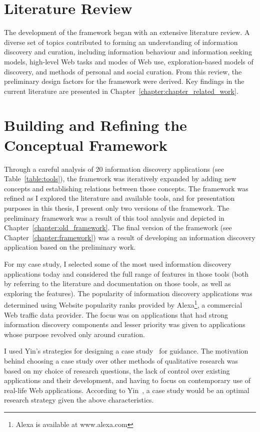 {\section{Literature Review}
\label{section:lit_review}
The development of the framework began with an extensive literature review. A diverse set of topics contributed to forming an understanding of information discovery and curation, including information behaviour and information seeking models, high-level Web tasks and modes of Web use, exploration-based models of discovery, and methods of personal and social curation. From this review, the preliminary design factors for the framework were derived. Key findings in the current literature are presented in Chapter~\ref{chapter:chapter_related_work}.
}%

{\section{Building and Refining the Conceptual Framework}
\label{section:building}
Through a careful analysis of 20 information discovery applications (see Table~\ref{table:tools}), the framework was iteratively expanded by adding new concepts and establishing relations between those concepts.  The framework was refined as I explored the literature and available tools, and for presentation purposes in this thesis, I present only two versions of the framework. The preliminary framework was a result of this tool analysis and depicted in Chapter~\ref{chapter:old_framework}. The final version of the framework (see Chapter~\ref{chapter:framework}) was a result of developing an information discovery application based on the preliminary work.    

For my case study, I selected some of the most used information discovery applications today and considered the full range of features in those tools (both by referring to the literature and documentation on those tools, as well as exploring the features). The popularity of information discovery applications was determined using Website popularity ranks provided by Alexa\footnote[1]{Alexa is available at www.alexa.com}, a commercial Web traffic data provider. The focus was on applications that had strong information discovery components and lesser priority was given to applications whose purpose revolved only around curation.

I used Yin's strategies for designing a case study~\cite{yin2014case} for guidance. The motivation behind choosing a case study over other methods of qualitative research was based on my choice of research questions, the lack of control over existing applications and their development, and having to focus on contemporary use of real-life Web applications. According to Yin~\cite{yin2014case}, a case study would be an optimal research strategy given the above characteristics.

}
